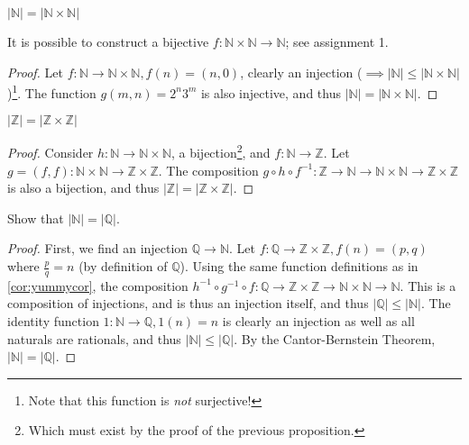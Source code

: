 \documentclass[12pt,oneside]{article}
\begin{document}
\begin{proposition}
  $|\mathbb{N}|=|\mathbb{N}\times\mathbb{N}|$
\end{proposition}

\begin{remark}
  It is possible to construct a bijective $f: \mathbb{N} \times \mathbb{N} \to \mathbb{N}$; see assignment 1. %
\end{remark}
\begin{proof}[Proof]
  Let $f: \mathbb{N} \to \mathbb{N} \times \mathbb{N}, f(n) = (n,0)$, clearly an injection ($\implies |\mathbb{N}| \leq |\mathbb{N} \times \mathbb{N}|$)\footnote{Note that this function is \textit{not} surjective!}. The function $g(m,n) = 2^n 3^m$ is also injective, and thus $|\mathbb{N}| = |\mathbb{N}\times\mathbb{N}|$.
\end{proof}

\begin{corollary}\label{cor:yummycor}
  $|\mathbb{Z}|=|\mathbb{Z}\times\mathbb{Z}|$
\end{corollary}
\begin{proof}[Proof]
  Consider $h: \mathbb{N} \to \mathbb{N}\times\mathbb{N}$, a bijection\footnote{Which must exist by the proof of the previous proposition.}, and $f: \mathbb{N} \to \mathbb{Z}$. Let $g=(f,f): \mathbb{N}\times\mathbb{N}\to\mathbb{Z}\times\mathbb{Z}$. The composition $g \circ h \circ f^{-1}: \mathbb{Z} \to \mathbb{N} \to \mathbb{N}\times \mathbb{N} \to \mathbb{Z} \times \mathbb{Z}$ is also a bijection, and thus $|\mathbb{Z}|=|\mathbb{Z}\times\mathbb{Z}|$.
\end{proof}

\begin{example}
  Show that $|\mathbb{N}|=|\mathbb{Q}|$.
  \begin{proof}[Proof]
    First, we find an injection $\mathbb{Q} \to \mathbb{N}$. Let $f: \mathbb{Q} \to \mathbb{Z} \times \mathbb{Z}, f(n) = (p,q)$ where $\frac{p}{q} = n$ (by definition of $\mathbb{Q}$). Using the same function definitions as in \cref{cor:yummycor}, the composition $h^{-1}\circ g^{-1}\circ f: \mathbb{Q} \to \mathbb{Z}\times \mathbb{Z} \to \mathbb{N}\times\mathbb{N} \to \mathbb{N}$. This is a composition of injections, and is thus an injection itself, and thus $|\mathbb{Q}|\leq|\mathbb{N}|$. The identity function $1:\mathbb{N} \to \mathbb{Q}, 1(n) = n$ is clearly an injection as well as all naturals are rationals, and thus $|\mathbb{N}|\leq|\mathbb{Q}|$. By the Cantor-Bernstein Theorem, $|\mathbb{N}|=|\mathbb{Q}|$.
  \end{proof}
\end{example}
\end{document}
